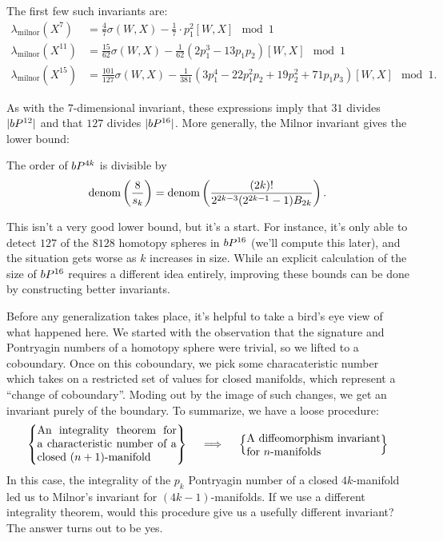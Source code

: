 \begin{example}
	The first few such invariants are:
	\[
		\begin{aligned}
			\lambda_{\mathrm{milnor}}(X^7)    
			& = \frac{4}{7}\sigma(W, X) - \frac{1}{7}\cdot p_1^2[W, X]\mod 1\\
			\lambda_{\mathrm{milnor}}(X^{11})    
			&= \frac{15}{62}\sigma(W,X) - \frac{1}{62}\left(2p_1^3-13p_1p_2\right)[W,X]\mod 1\\
			\lambda_{\mathrm{milnor}}(X^{15}) 
			& = \frac{101}{127}\sigma(W, X) - 
			\frac{1}{381}\left(3p_1^4-22p_1^2p_2 + 19p_2^2 + 71p_1p_3\right)[W,X]\mod 1.
		\end{aligned}
	\]
\end{example}


As with the $7$-dimensional invariant, these expressions imply that $31$ divides $|bP^{12}|$ and that $127$ divides $|bP^{16}|$. More generally, the Milnor invariant gives the lower bound:
\begin{proposition}\label{prop:milnor-lower-bound}
	The order of $bP^{4k}$ is divisible by
	\[
		\operatorname{denom}\left(\frac{8}{s_k}\right)=\operatorname{denom}\left(\frac{(2k)!}{2^{2k-3}(2^{2k-1} -1)B_{2k}}\right).
	\]
\end{proposition}

This isn't a very good lower bound, but it's a start. For instance, it's only able to detect $127$ of the $8128$ homotopy spheres in $bP^{16}$ (we'll compute this later), and the situation gets worse as $k$ increases in size. While an explicit calculation of the size of $bP^{16}$ requires a different idea entirely, improving these bounds can be done by constructing better invariants.

Before any generalization takes place, it's helpful to take a bird's eye view of what happened here. We started with the observation that the signature and Pontryagin numbers of a homotopy sphere were trivial, so we lifted to a coboundary. Once on this coboundary, we pick some characateristic number which takes on a restricted set of values for closed manifolds, which represent a ``change of coboundary''. Moding out by the image of such changes, we get an invariant purely of the boundary. To summarize, we have a loose procedure:
\[
	\left\{\parbox{12.5em}{An integrality theorem for a characteristic number of a closed $(n+1)$-manifold}\right\}
	\quad\implies \quad
	\left\{\parbox{12em}{A diffeomorphism invariant for $n$-manifolds}\right\}
\]
In this case, the integrality of the $p_k$ Pontryagin number of a closed $4k$-manifold led us to Milnor's invariant for $(4k-1)$-manifolds. 
If we use a different integrality theorem, would this procedure give us a usefully different invariant? The answer turns out to be yes.


